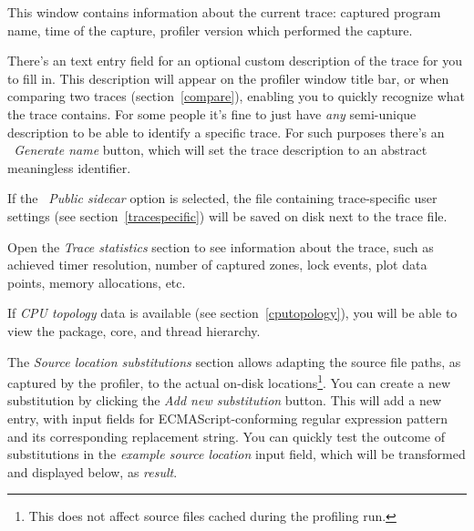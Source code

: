 \documentclass[hidelinks,titlepage,a4paper,twoside]{article}
\begin{document}
This window contains information about the current trace: captured program name, time of the capture, profiler version which performed the capture.

There's an text entry field for an optional custom description of the trace for you to fill in. This description will appear on the profiler window title bar, or when comparing two traces (section~\ref{compare}), enabling you to quickly recognize what the trace contains. For some people it's fine to just have \emph{any} semi-unique description to be able to identify a specific trace. For such purposes there's an \emph{\faDice{}~Generate name} button, which will set the trace description to an abstract meaningless identifier.

If the \emph{\faUserGear{}~Public sidecar} option is selected, the file containing trace-specific user settings (see section~\ref{tracespecific}) will be saved on disk next to the trace file.

Open the \emph{Trace statistics} section to see information about the trace, such as achieved timer resolution, number of captured zones, lock events, plot data points, memory allocations, etc.

If \emph{CPU topology} data is available (see section~\ref{cputopology}), you will be able to view the package, core, and thread hierarchy.

The \emph{Source location substitutions} section allows adapting the source file paths, as captured by the profiler, to the actual on-disk locations\footnote{This does not affect source files cached during the profiling run.}. You can create a new substitution by clicking the \emph{Add new substitution} button. This will add a new entry, with input fields for ECMAScript-conforming regular expression pattern and its corresponding replacement string. You can quickly test the outcome of substitutions in the \emph{example source location} input field, which will be transformed and displayed below, as \emph{result}.
\end{document}
